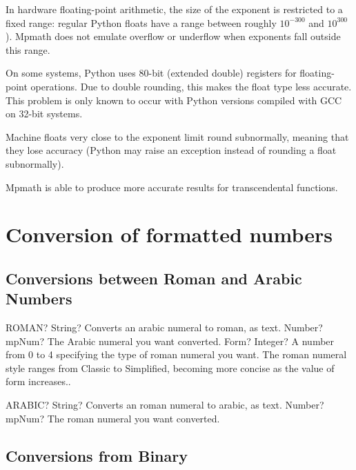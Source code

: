 In hardware floating-point arithmetic, the size of the exponent is restricted to a fixed range: regular Python floats have a range between roughly $10^{-300}$ and $10^{300}$). Mpmath does not emulate overflow or underflow when exponents fall outside this range.

On some systems, Python uses 80-bit (extended double) registers for floating-point operations. Due to double rounding, this makes the float type less accurate. This problem is only known to occur with Python versions compiled with GCC on 32-bit systems.

Machine floats very close to the exponent limit round subnormally, meaning that they lose accuracy (Python may raise an exception instead of rounding a float subnormally).

Mpmath is able to produce more accurate results for transcendental functions.






\newpage
\section{Conversion of formatted numbers}
\subsection{Conversions between Roman and Arabic Numbers}

\begin{mpFunctionsExtract}
	\mpWorksheetFunctionTwoNotImplemented
	{ROMAN? String? Converts an arabic numeral to roman, as text.}
	{Number? mpNum? The Arabic numeral you want converted.}
	{Form? Integer? A number from 0 to 4 specifying the type of roman numeral you want. The roman numeral style ranges from Classic to Simplified, becoming more concise as the value of form increases..}
\end{mpFunctionsExtract}

\vspace{0.6cm}

\begin{mpFunctionsExtract}
	\mpWorksheetFunctionOneNotImplemented
	{ARABIC? String? Converts an roman numeral to arabic, as text.}
	{Number? mpNum? The roman numeral you want converted.}
\end{mpFunctionsExtract}




\subsection{Conversions from Binary}

